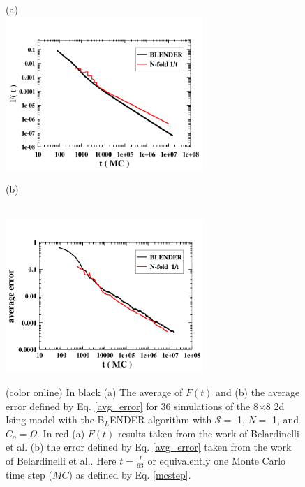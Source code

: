 \documentclass[aps,pre,reprint,superscriptaddress,showkeys]{revtex4-1}
\begin{document}
\begin{figure}
(a)\\
\includegraphics[width=7.5cm]{./figures/Avg_F_8X8.png}
\centerline{(b)}\\
\includegraphics[width=7.5cm]{./figures/Avg_error_8X8.png}
\caption{(color online) In black (a) The average of $F(t)$ and (b) the average error defined by Eq. \ref{avg_error}  for 36 simulations of the 8$\times$8 2d Ising model with the B$_L$ENDER algorithm with $\mathcal{S}=$ 1, $N=$ 1, and $C_o = \Omega$. In red (a) $F(t)$ results taken from the work of Belardinelli et al. \cite{saturation} (b) the error defined by Eq. \ref{avg_error} taken from the  work of Belardinelli et al.. Here $t = \frac{I}{63}$ or equivalently one Monte Carlo time step ($MC$) as defined by Eq. \ref{mcstep}.\label{FtandA} }
\end{figure}
\end{document}

